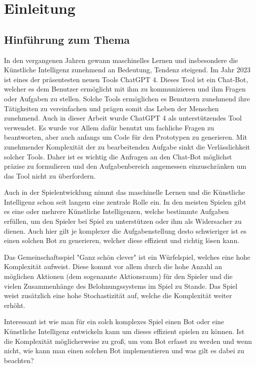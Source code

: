 \section{Einleitung}
\subsection{Hinführung zum Thema}
In den vergangenen Jahren gewann maschinelles Lernen und insbesondere die Künstliche Intelligenz zunehmend an Bedeutung, Tendenz steigend. Im Jahr 2023 ist eines der präsentesten neuen Tools ChatGPT 4. Dieses Tool ist ein Chat-Bot, welcher es dem Benutzer ermöglicht mit ihm zu kommunizieren und ihm Fragen oder Aufgaben zu stellen. Solche Tools ermöglichen es Benutzern zunehmend ihre Tätigkeiten zu vereinfachen und prägen somit das Leben der Menschen zunehmend. Auch in dieser Arbeit wurde ChatGPT 4 als unterstützendes Tool verwendet. Es wurde vor Allem dafür benutzt um fachliche Fragen zu beantworten, aber auch anfangs um Code für den Prototypen zu generieren. Mit zunehmender Komplexität der zu bearbeitenden Aufgabe sinkt die Verlässlichkeit solcher Tools. Daher ist es wichtig die Anfragen an den Chat-Bot möglichst präzise zu formulieren und den Aufgabenbereich angemessen einzuschränken um das Tool nicht zu überfordern.

Auch in der Spielentwicklung nimmt das maschinelle Lernen und die Künstliche Intelligenz schon seit langem eine zentrale Rolle ein. In den meisten Spielen gibt es eine oder mehrere Künstliche Intelligenzen, welche bestimmte Aufgaben erfüllen, um den Spieler bei Spiel zu unterstützen oder ihm als Widersacher zu dienen. Auch hier gilt je komplexer die Aufgabenstellung desto schwieriger ist es einen solchen Bot zu generieren, welcher diese effizient und richtig lösen kann.

Das Gemeinschaftsspiel "Ganz schön clever" ist ein Würfelspiel, welches eine hohe Komplexität aufweist. Diese kommt vor allem durch die hohe Anzahl an möglichen Aktionen (dem sogenannte Aktionsraum) für den Spieler und die vielen Zusammenhänge des Belohnungssystems im Spiel zu Stande. Das Spiel weist zusätzlich eine hohe Stochastizität auf, welche die Komplexität weiter erhöht.

Interessant ist wie man für ein solch komplexes Spiel einen Bot oder eine Künstliche Intelligenz entwickeln kann um dieses effizient spielen zu können. Ist die Komplexität möglicherweise zu groß, um vom Bot erfasst zu werden und wenn nicht, wie kann man einen solchen Bot implementieren und was gilt es dabei zu beachten?
